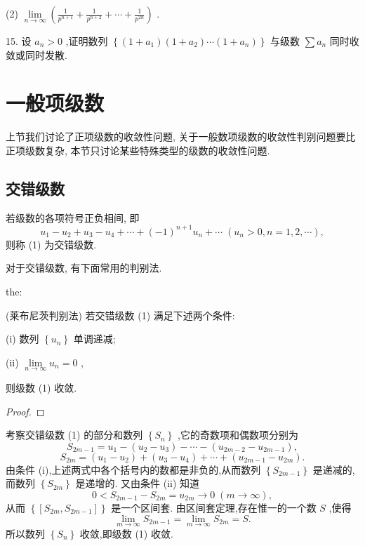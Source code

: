 (2) \(\mathop{\lim }\limits_{{n \rightarrow  \infty }}\left( {\frac{1}{{p}^{n + 1}} + \frac{1}{{p}^{n + 2}} + \cdots  + \frac{1}{{p}^{2n}}}\right)\) .

15. 设 \({a}_{n} > 0\) ,证明数列 \(\left\{  {\left( {1 + {a}_{1}}\right) \left( {1 + {a}_{2}}\right) \cdots \left( {1 + {a}_{n}}\right) }\right\}\) 与级数 \(\sum {a}_{n}\) 同时收敛或同时发散.

\section{一般项级数}

上节我们讨论了正项级数的收敛性问题, 关于一般数项级数的收敛性判别问题要比正项级数复杂, 本节只讨论某些特殊类型的级数的收敛性问题.

\subsection{交错级数}

若级数的各项符号正负相间, 即
\[
{u}_{1} - {u}_{2} + {u}_{3} - {u}_{4} + \cdots  + {\left( -1\right) }^{n + 1}{u}_{n} + \cdots \;\left( {{u}_{n} > 0,n = 1,2,\cdots }\right) , \tag{1}
\]
则称 (1) 为交错级数.

对于交错级数, 有下面常用的判别法.

\begin{theorem}{}{the:}

\end{theorem}
(莱布尼茨判别法) 若交错级数 (1) 满足下述两个条件:

(i) 数列 \(\left\{  {u}_{n}\right\}\) 单调递减;

(ii) \(\mathop{\lim }\limits_{{n \rightarrow  \infty }}{u}_{n} = 0\) ,

则级数 (1) 收敛.

\begin{proof}

\end{proof}
考察交错级数 (1) 的部分和数列 \(\left\{  {S}_{n}\right\}\) ,它的奇数项和偶数项分别为
\[
{S}_{{2m} - 1} = {u}_{1} - \left( {{u}_{2} - {u}_{3}}\right)  - \cdots  - \left( {{u}_{{2m} - 2} - {u}_{{2m} - 1}}\right) ,
\]
\[
{S}_{2m} = \left( {{u}_{1} - {u}_{2}}\right)  + \left( {{u}_{3} - {u}_{4}}\right)  + \cdots  + \left( {{u}_{{2m} - 1} - {u}_{2m}}\right) .
\]
由条件 (i),上述两式中各个括号内的数都是非负的,从而数列 \(\left\{  {S}_{{2m} - 1}\right\}\) 是递减的,而数列 \(\left\{  {S}_{2m}\right\}\) 是递增的. 又由条件 (ii) 知道
\[
0 < {S}_{{2m} - 1} - {S}_{2m} = {u}_{2m} \rightarrow  0\;\left( {m \rightarrow  \infty }\right) ,
\]
从而 \(\left\{  \left\lbrack  {{S}_{2m},{S}_{{2m} - 1}}\right\rbrack  \right\}\) 是一个区间套. 由区间套定理,存在惟一的一个数 \(S\) ,使得
\[
\mathop{\lim }\limits_{{m \rightarrow  \infty }}{S}_{{2m} - 1} = \mathop{\lim }\limits_{{m \rightarrow  \infty }}{S}_{2m} = S.
\]
所以数列 \(\left\{  {S}_{n}\right\}\) 收敛,即级数 (1) 收敛.

